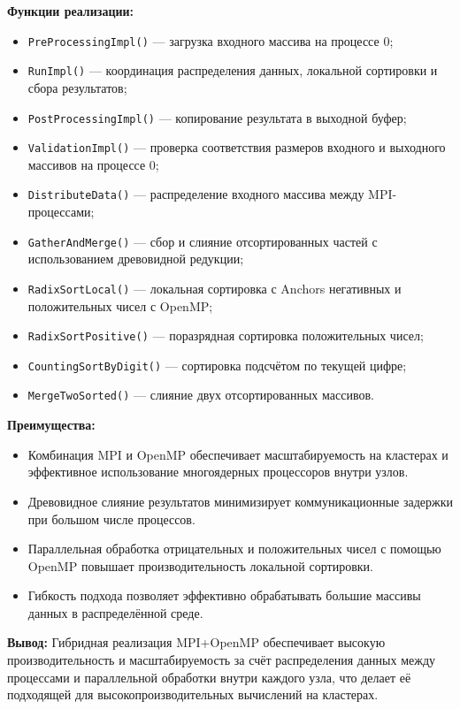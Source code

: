 \documentclass[12pt]{article}
\begin{document}
\textbf{Функции реализации:}
\begin{itemize}
  \item \texttt{PreProcessingImpl()} — загрузка входного массива на процессе 0;
  \item \texttt{RunImpl()} — координация распределения данных, локальной сортировки и сбора результатов;
  \item \texttt{PostProcessingImpl()} — копирование результата в выходной буфер;
  \item \texttt{ValidationImpl()} — проверка соответствия размеров входного и выходного массивов на процессе 0;
  \item \texttt{DistributeData()} — распределение входного массива между MPI-процессами;
  \item \texttt{GatherAndMerge()} — сбор и слияние отсортированных частей с использованием древовидной редукции;
  \item \texttt{RadixSortLocal()} — локальная сортировка с Anchors негативных и положительных чисел с OpenMP;
  \item \texttt{RadixSortPositive()} — поразрядная сортировка положительных чисел;
  \item \texttt{CountingSortByDigit()} — сортировка подсчётом по текущей цифре;
  \item \texttt{MergeTwoSorted()} — слияние двух отсортированных массивов.
\end{itemize}

\textbf{Преимущества:}
\begin{itemize}
  \item Комбинация MPI и OpenMP обеспечивает масштабируемость на кластерах и эффективное использование многоядерных процессоров внутри узлов.
  \item Древовидное слияние результатов минимизирует коммуникационные задержки при большом числе процессов.
  \item Параллельная обработка отрицательных и положительных чисел с помощью OpenMP повышает производительность локальной сортировки.
  \item Гибкость подхода позволяет эффективно обрабатывать большие массивы данных в распределённой среде.
\end{itemize}

\textbf{Вывод:} Гибридная реализация MPI+OpenMP обеспечивает высокую производительность и масштабируемость за счёт распределения данных между процессами и параллельной обработки внутри каждого узла, что делает её подходящей для высокопроизводительных вычислений на кластерах.
\end{document}
